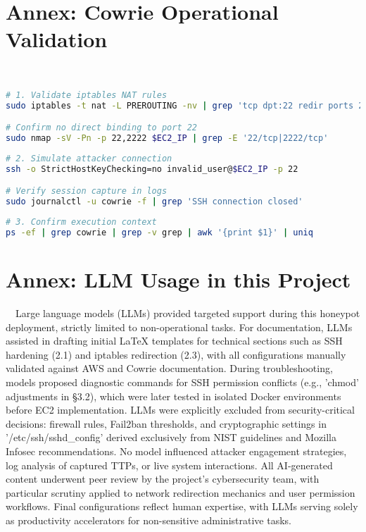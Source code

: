 \newpage

\section{Annex: Cowrie Operational Validation}  
\label{annex:cowrie-validation}  
\
\
\begin{lstlisting}[language=bash,label={lst:cowrie-redirect},caption={Traffic Redirection Verification}]  
# 1. Validate iptables NAT rules  
sudo iptables -t nat -L PREROUTING -nv | grep 'tcp dpt:22 redir ports 2222'  

# Confirm no direct binding to port 22  
sudo nmap -sV -Pn -p 22,2222 $EC2_IP | grep -E '22/tcp|2222/tcp'  
\end{lstlisting}  

\begin{lstlisting}[language=bash,label={lst:cowrie-access},caption={Honeypot Engagement Testing}]  
# 2. Simulate attacker connection  
ssh -o StrictHostKeyChecking=no invalid_user@$EC2_IP -p 22  

# Verify session capture in logs  
sudo journalctl -u cowrie -f | grep 'SSH connection closed'  
\end{lstlisting}  

\begin{lstlisting}[language=bash,label={lst:cowrie-context},caption={Process Isolation Validation}]  
# 3. Confirm execution context  
ps -ef | grep cowrie | grep -v grep | awk '{print $1}' | uniq  
\end{lstlisting}  




\newpage


\newpage 


\section{Annex: LLM Usage in this Project}  
\label{annex:llm}  
\
\
Large language models (LLMs) provided targeted support during this honeypot deployment, strictly limited to non-operational tasks. For documentation, LLMs assisted in drafting initial LaTeX templates for technical sections such as SSH hardening (2.1) and iptables redirection (2.3), with all configurations manually validated against AWS and Cowrie documentation. During troubleshooting, models proposed diagnostic commands for SSH permission conflicts (e.g., 'chmod' adjustments in §3.2), which were later tested in isolated Docker environments before EC2 implementation. LLMs were explicitly excluded from security-critical decisions: firewall rules, Fail2ban thresholds, and cryptographic settings in '/etc/ssh/sshd\_config' derived exclusively from NIST guidelines and Mozilla Infosec recommendations. No model influenced attacker engagement strategies, log analysis of captured TTPs, or live system interactions. 
All AI-generated content underwent peer review by the project’s cybersecurity team, with particular scrutiny applied to network redirection mechanics and user permission workflows. Final configurations reflect human expertise, with LLMs serving solely as productivity accelerators for non-sensitive administrative tasks.    

